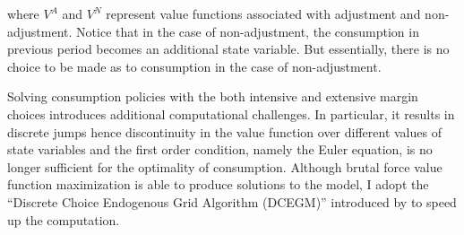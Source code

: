 where $V^A$ and $V^N$ represent value functions associated with adjustment and non-adjustment. Notice that in the case of non-adjustment, the consumption in previous period becomes an additional state variable. But essentially, there is no choice to be made as to consumption in the case of non-adjustment. 

Solving consumption policies with the both intensive and extensive margin choices introduces additional computational challenges. In particular, it results in discrete jumps hence discontinuity in the value function over different values of state variables and the first order condition, namely the Euler equation, is no longer sufficient for the optimality of consumption. Although brutal force value function maximization is able to produce solutions to the model, I adopt the ``Discrete Choice Endogenous Grid Algorithm (DCEGM)'' introduced by \cite{iskhakov2017endogenous} to speed up the computation.
